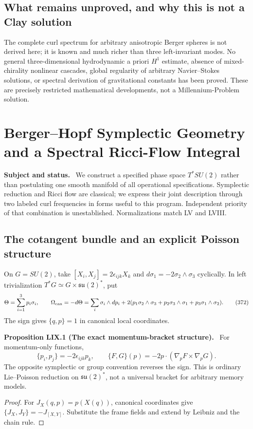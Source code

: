 \documentclass[11pt,a4paper,oneside]{book}
\newcommand{\statement}[3]{\par\medskip\noindent\textbf{#1 #2 (#3).}\ }
\newcommand{\note}[1]{\par\medskip\noindent\textbf{#1}\ }
\begin{document}
\section{What remains unproved, and why this is not a Clay solution}
The complete curl spectrum for arbitrary anisotropic Berger spheres is not derived here; it is known and much richer than three left-invariant modes. No general three-dimensional hydrodynamic a priori $H^1$ estimate, absence of mixed-chirality nonlinear cascades, global regularity of arbitrary Navier--Stokes solutions, or spectral derivation of gravitational constants has been proved. These are precisely restricted mathematical developments, not a Millennium-Problem solution.

\chapter{Berger--Hopf Symplectic Geometry and a Spectral Ricci-Flow Integral}
\note{Subject and status.} We construct a specified phase space $T^*SU(2)$ rather than postulating one smooth manifold of all operational specifications. Symplectic reduction and Ricci flow are classical; we express their joint description through two labeled curl frequencies in forms useful to this program. Independent priority of that combination is unestablished. Normalizations match LV and LVIII.
\section{The cotangent bundle and an explicit Poisson structure}
On $G=SU(2)$, take $[X_i,X_j]=2\epsilon_{ijk}X_k$ and $d\sigma_1=-2\sigma_2\wedge\sigma_3$ cyclically. In left trivialization $T^*G\simeq G\times\mathfrak{su}(2)^*$, put
\begin{equation}\Theta=\sum_{i=1}^3p_i\sigma_i,\qquad\Omega_{\rm can}=-d\Theta=\sum_i\sigma_i\wedge dp_i+2(p_1\sigma_2\wedge\sigma_3+p_2\sigma_3\wedge\sigma_1+p_3\sigma_1\wedge\sigma_2).\tag{372}\end{equation}
The sign gives $\{q,p\}=1$ in canonical local coordinates.
\statement{Proposition}{LIX.1}{The exact momentum-bracket structure}
For momentum-only functions,
\begin{equation}\{p_i,p_j\}=-2\epsilon_{ijk}p_k,\qquad\{F,G\}(p)=-2p\cdot(\nabla_pF\times\nabla_pG).\tag{373}\end{equation}
The opposite symplectic or group convention reverses the sign. This is ordinary Lie--Poisson reduction on $\mathfrak{su}(2)^*$, not a universal bracket for arbitrary memory models.
\begin{proof}
For $J_X(q,p)=p(X(q))$, canonical coordinates give $\{J_X,J_Y\}=-J_{[X,Y]}$. Substitute the frame fields and extend by Leibniz and the chain rule.
\end{proof}
\end{document}
